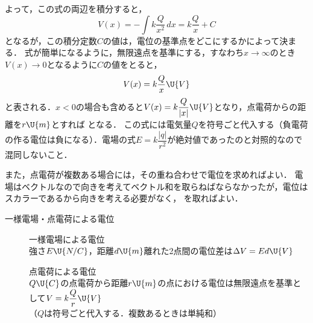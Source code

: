 \noindent よって，この式の両辺を積分すると，
\[V(x)=-\int k\frac{Q}{x^2}\,dx=k\frac{Q}{x}+C\]
となるが，この積分定数$C$の値は，電位の基準点をどこにするかによって決まる．
式が簡単になるように，{\gtfamily 無限遠点を基準にする}，すなわち$x\rightarrow\infty$のとき$V(x)\rightarrow 0$となるように$C$の値をとると，
\[V(x)=k\frac{Q}{x}\U{V}\]
と表される．$x<0$の場合も含めると$V(x)=k\dfrac{Q}{|x|}\U{V}$となり，点電荷からの距離を$r\U{m}$とすれば
となる．
{\gtfamily この式には電気量$Q$を符号ごと代入する}（負電荷の作る電位は負になる）．電場の式$E=k\dfrac{|q|}{r^2}$が絶対値であったのと対照的なので混同しないこと．

また，点電荷が複数ある場合には，その重ね合わせで電位を求めればよい．
電場はベクトルなので向きを考えてベクトル和を取らねばならなかったが，{\gtfamily 電位はスカラーであるから向きを考える必要がなく}，\,\,を取ればよい．

\begin{matome}{一様電場・点電荷による電位}
\begin{description}
\item[] {\gtfamily 一様電場による電位}\\
強さ$E\U{N/C}$，距離$d\U{m}$離れた2点間の電位差は\hspace{3mm}$\Delta V=Ed\U{V}$
\item[] {\gtfamily 点電荷による電位}\\
$Q\U{C}$の点電荷から距離$r\U{m}$の点における電位は無限遠点を基準として\hspace{3mm}$V=k\dfrac{Q}{r}\U{V}$\\[0.5mm]
（$Q$は{\gtfamily 符号ごと}代入する．複数あるときは{\gtfamily 単純和}）
\end{description}
\end{matome}


